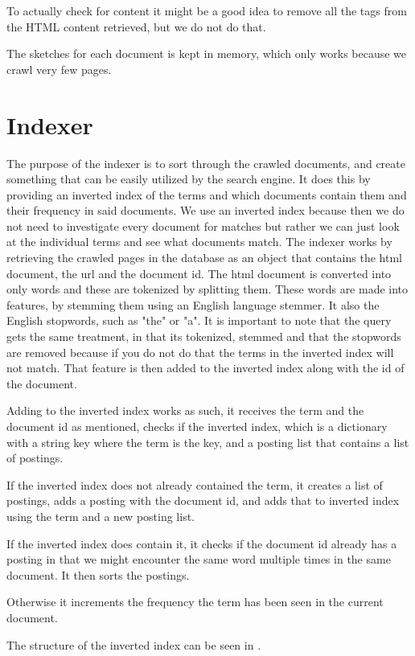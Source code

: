 	To actually check for content it might be a good idea to remove all the tags from the HTML content retrieved, but we do not do that.
	
	The sketches for each document is kept in memory, which only works because we crawl very few pages.
	
	\section{Indexer}
	The purpose of the indexer is to sort through the crawled documents, and create something that can be easily utilized by the search engine. It does this by providing an inverted index of the terms and which documents contain them and their frequency in said documents.
	We use an inverted index because then we do not need to investigate every document for matches but rather we can just look at the individual terms and see what documents match.
	The indexer works by retrieving the crawled pages in the database as an object that contains the html document, the url and the document id.
	The html document is converted into only words and these are tokenized by splitting them. 
	These words are made into features, by stemming them using an English language stemmer. It also the English stopwords, such as "the" or "a".
	It is important to note that the query gets the same treatment, in that its tokenized, stemmed and that the stopwords are removed because if you do not do that the terms in the inverted index will not match.
	That feature is then added to the inverted index along with the id of the document.
	
	Adding to the inverted index works as such, it receives the term and the document id as mentioned, checks if the inverted index, which is a dictionary with a string key where the term is the key, and a posting list that contains a list of postings.
	
	If the inverted index does not already contained the term, it creates a list of postings, adds a posting with the document id, and adds that to inverted index using the term and a new posting list.
	
	If the inverted index does contain it, it checks if the document id already has a posting in that we might encounter the same word multiple times in the same document. It then sorts the postings.
	
	Otherwise it increments the frequency the term has been seen in the current document.
	
	The structure of the inverted index can be seen in .
	
